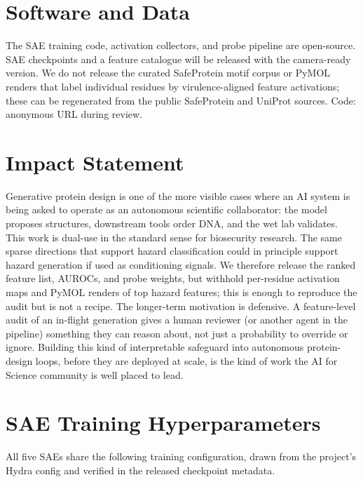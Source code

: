 \documentclass{article}
\theoremstyle{plain}
\theoremstyle{definition}
\theoremstyle{remark}
\begin{document}
\section*{Software and Data}

The SAE training code, activation collectors, and probe pipeline are open-source. SAE checkpoints and a feature catalogue will be released with the camera-ready version. We do not release the curated SafeProtein motif corpus or PyMOL renders that label individual residues by virulence-aligned feature activations; these can be regenerated from the public SafeProtein and UniProt sources. Code: anonymous URL during review.

\section*{Impact Statement}

Generative protein design is one of the more visible cases where an AI system is being asked to operate as an autonomous scientific collaborator: the model proposes structures, downstream tools order DNA, and the wet lab validates. This work is dual-use in the standard sense for biosecurity research. The same sparse directions that support hazard classification could in principle support hazard generation if used as conditioning signals. We therefore release the ranked feature list, AUROCs, and probe weights, but withhold per-residue activation maps and PyMOL renders of top hazard features; this is enough to reproduce the audit but is not a recipe. The longer-term motivation is defensive. A feature-level audit of an in-flight generation gives a human reviewer (or another agent in the pipeline) something they can reason about, not just a probability to override or ignore. Building this kind of interpretable safeguard into autonomous protein-design loops, before they are deployed at scale, is the kind of work the AI for Science community is well placed to lead.




\appendix
\onecolumn

\section{SAE Training Hyperparameters}
\label{app:hparams}

All five SAEs share the following training configuration, drawn from the project's Hydra config and verified in the released checkpoint metadata.
\end{document}
